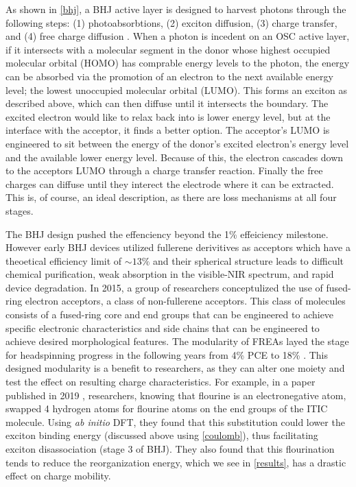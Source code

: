 As shown in \ref{bhj}, a BHJ active layer is designed to harvest photons through the following 
steps: (1) photoabsorbtions, 
(2) exciton diffusion, (3) charge transfer, and (4) free charge diffusion \cite{Fusella2019}. 
When a photon is incedent on
an OSC active layer, if it intersects with a molecular segment in the donor whose 
highest occupied molecular orbital (HOMO) has comprable energy levels to the photon, 
the energy can be absorbed via the promotion of
an electron to the next available energy level; the lowest unoccupied molecular orbital (LUMO).
This forms an exciton as
described above, which can then diffuse until it intersects the boundary. 
The excited electron would like to relax
back into is lower energy level, but at the interface with the acceptor, it finds a better option. The
acceptor's LUMO is engineered to sit between the energy of the donor's excited electron's energy level and the
available lower energy level. Because of this, the electron cascades down to the acceptors LUMO through a charge
transfer reaction. Finally the free charges can diffuse until they interect the electrode where it can be
extracted. This is, of course, an ideal description, as there are loss mechanisms at all four stages. 


The BHJ design pushed the effenciency beyond the 1\% effeiciency milestone. However early BHJ devices utilized
fullerene derivitives as acceptors which have a theoetical efficiency limit of $\sim13\%$ \cite{Scharber2016}
and their spherical
structure leads to difficult chemical purification, weak absorption in the visible-NIR spectrum, and rapid
device degradation. In 2015, a group of researchers conceptulized the use of
fused-ring electron acceptors, a class of non-fullerene acceptors. This class of molecules consists of
a fused-ring core and end groups that can be engineered to achieve specific electronic characteristics and side
chains that can be engineered to achieve desired morphological features. The modularity of FREAs
layed the stage for headspinning progress in the following years from 4\% PCE to 18\% \cite{Wang2021a}. 
This designed modularity is a benefit to researchers, as they can alter one moiety and test
the effect on resulting charge characteristics. For example, in a paper published in 2019 \cite{Benatto2019},
researchers, knowing that flourine is an electronegative atom, swapped 4 hydrogen atoms for flourine atoms on
the end groups of the ITIC molecule. Using \textit{ab initio} DFT, they found 
that this substitution could lower the exciton
binding energy (discussed above using \autoref{coulomb}), thus facilitating exciton disassociation (stage 3 of
BHJ). They also found
that this flourination tends to reduce the reorganization energy, which we see in \autoref{results}, has a
drastic effect on charge mobility.

